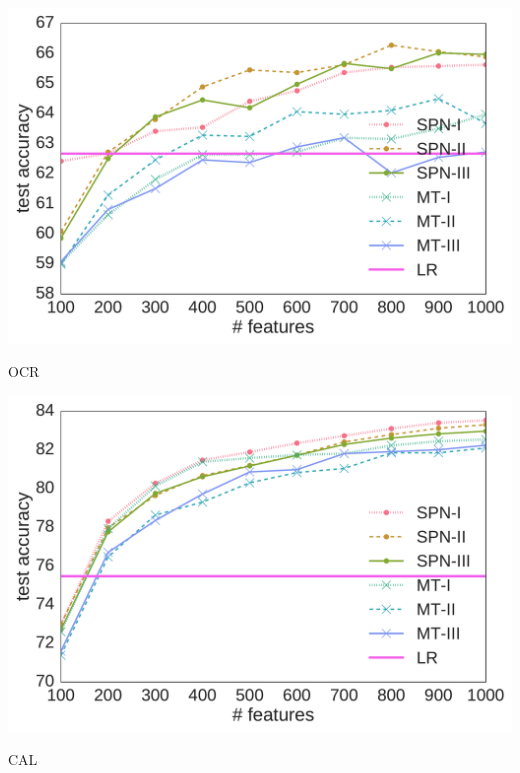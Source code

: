 \documentclass[final]{beamer}
\begin{document}
\begin{frame}{}
\begin{textblock}{80}
\begin{center}
\begin{minipage}[t]{0.2\linewidth}
        \begin{center}
          \includegraphics[width=1.0\linewidth]{figures/lines-caltech101}\par
          \footnotesize\textsf{OCR}
        \end{center}
      \end{minipage}\begin{minipage}[t]{0.2\linewidth}
        \begin{center}
          \includegraphics[width=1.0\linewidth]{figures/lines-ocr_letters}\par
          \footnotesize\textsf{CAL}
        \end{center}
      \end{minipage}\begin{minipage}[t]{0.2\linewidth}
        \begin{center}

\end{center}
\end{minipage}
\end{center}
\end{textblock}
\end{frame}
\end{document}
